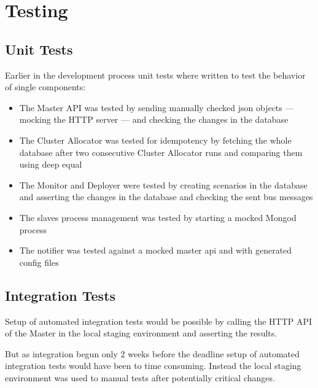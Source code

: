 \section{Testing}

\subsection{Unit Tests}
Earlier in the development process unit tests where written to test the behavior of single components:

\begin{itemize}
	\item The Master API was tested by sending manually checked json objects --- mocking the HTTP server --- and checking the changes in the database
	\item The Cluster Allocator was tested for idempotency by fetching the whole database after two consecutive Cluster Allocator runs and comparing them using deep equal
	\item The Monitor and Deployer were tested by creating scenarios in the database and asserting the changes in the database and checking the sent bus messages
	\item The slaves process management was tested by starting a mocked Mongod process
	\item The notifier was tested against a mocked master api and with generated config files
\end{itemize}

\subsection{Integration Tests}

Setup of automated integration tests would be possible by calling the HTTP API of the Master in the local staging environment and asserting the results.

But as integration begun only 2 weeks before the deadline setup of automated integration tests would have been to time consuming.
Instead the local staging environment was used to manual tests after potentially critical changes.
